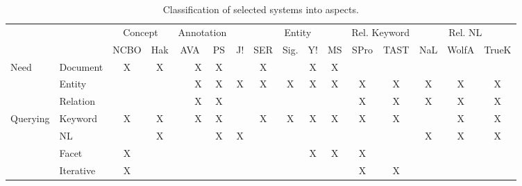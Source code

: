 \begin{table}[htbp]
  \centering
  \caption{Classification of selected systems into aspects.}
    \begin{tabular}{|r|r||c|c|r|c|c|c|c|c|c|c|c|c|c|r|}
    \hline
    \multicolumn{1}{|c}{} & \multicolumn{1}{c||}{} & \multicolumn{2}{c|}{Concept} & \multicolumn{2}{c|}{Annotation} &       & \multicolumn{4}{c|}{Entity}   & \multicolumn{2}{c|}{Rel. Keyword} & \multicolumn{3}{c|}{Rel. NL}   \bigstrut\\
\cline{3-16}    \multicolumn{1}{|c}{} & \multicolumn{1}{c||}{} & NCBO  & Hak   & \multicolumn{1}{c|}{AVA} & PS    & J!    & SER   & Sig.  & Y!    & MS    & SPro  & TAST  & NaL   & WolfA & \multicolumn{1}{c|}{TrueK} \bigstrut\\
    \hline
    \hline
    \multicolumn{1}{|l|}{\multirow{3}[6]{*}{Need}} & \multicolumn{1}{l||}{Document} & X     & X     & X     & X     &       & X     &       & X     & X     &       &       &       &       &  \bigstrut\\
\cline{2-16}    \multicolumn{1}{|l|}{} & \multicolumn{1}{l||}{Entity} &       &       & X     & X     & X     & X     & X     & X     & X     & X     & X     & X     & X     & \multicolumn{1}{c|}{X} \bigstrut\\
\cline{2-16}    \multicolumn{1}{|l|}{} & \multicolumn{1}{l||}{Relation} &       &       & X     & X     &       &       &       &       &       & X     & X     & X     & X     & \multicolumn{1}{c|}{X} \bigstrut\\
    \hline
    \multicolumn{1}{|l|}{\multirow{4}[8]{*}{Querying}} & \multicolumn{1}{l||}{Keyword} & X     & X     & X     & X     &       & X     & X     & X     & X     & X     & X     &       & X     & \multicolumn{1}{c|}{X} \bigstrut\\
\cline{2-16}    \multicolumn{1}{|l|}{} & \multicolumn{1}{l||}{NL} &       & X     &       & X     & X     &       &       &       &       &       &       & X     & X     & \multicolumn{1}{c|}{X} \bigstrut\\
\cline{2-16}    \multicolumn{1}{|l|}{} & \multicolumn{1}{l||}{Facet} & X     &       &       &       &       &       &       & X     & X     & X     &       &       &       &  \bigstrut\\
\cline{2-16}    \multicolumn{1}{|l|}{} & \multicolumn{1}{l||}{Iterative} & X     &       &       &       &       &       &       &       &       & X     & X     &       &       &  \bigstrut\\
    \hline

\end{tabular}
\end{table}
